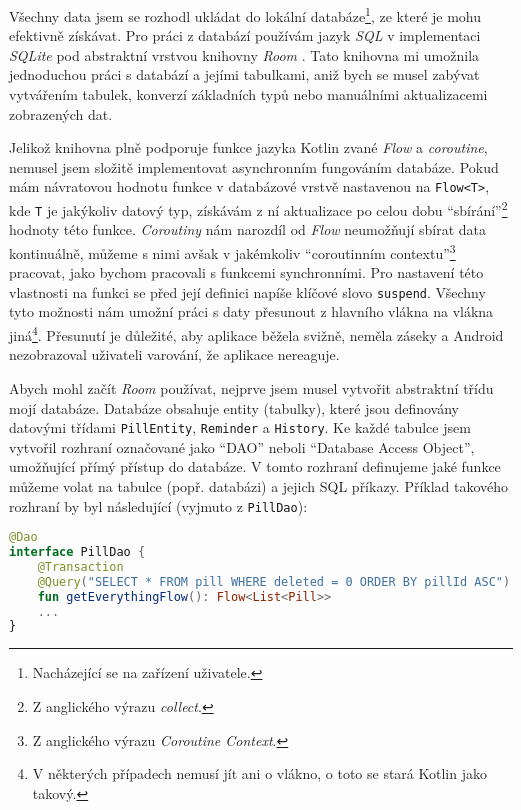 \documentclass[../TakeYourPill.tex]{subfiles}
\begin{document}
Všechny data jsem se rozhodl ukládat do lokální databáze\footnote{Nacházející se na zařízení uživatele.}, ze které je mohu efektivně získávat. Pro práci z databází používám jazyk \textit{SQL} v implementaci \textit{SQLite} pod abstraktní vrstvou knihovny \textit{Room} \cite{room}. Tato knihovna mi umožnila jednoduchou práci s databází a jejími tabulkami, aniž bych se musel zabývat vytvářením tabulek, konverzí základních typů nebo manuálními aktualizacemi zobrazených dat. 

Jelikož knihovna plně podporuje funkce jazyka Kotlin zvané \textit{Flow} a \textit{coroutine}, nemusel jsem složitě implementovat asynchronním fungováním databáze. Pokud mám návratovou hodnotu funkce v databázové vrstvě nastavenou na \texttt{Flow<T>}, kde \texttt{T} je jakýkoliv datový typ, získávám z ní aktualizace po celou dobu \enquote{sbírání}\footnote{Z anglického výrazu \textit{collect}.} hodnoty této funkce. \textit{Coroutiny} nám narozdíl od \textit{Flow} neumožňují sbírat data kontinuálně, můžeme s nimi avšak v jakémkoliv \enquote{coroutinním contextu}\footnote{Z anglického výrazu \textit{Coroutine Context}.} pracovat, jako bychom pracovali s funkcemi synchronními. Pro nastavení této vlastnosti na funkci se před její definici napíše klíčové slovo \texttt{suspend}. Všechny tyto možnosti nám umožní práci s daty přesunout z hlavního vlákna na vlákna jiná\footnote{V některých případech nemusí jít ani o vlákno, o toto se stará Kotlin jako takový.}. Přesunutí je důležité, aby aplikace běžela svižně, neměla záseky a Android nezobrazoval uživateli varování, že aplikace nereaguje.

Abych mohl začít \textit{Room} používat, nejprve jsem musel vytvořit abstraktní třídu mojí databáze. Databáze obsahuje entity (tabulky), které jsou definovány datovými třídami \texttt{PillEntity}, \texttt{Reminder} a \texttt{History}. Ke každé tabulce jsem vytvořil rozhraní označované jako \enquote{DAO} neboli \enquote{Database Access Object}, umožňující přímý přístup do databáze. V tomto rozhraní definujeme jaké funkce můžeme volat na tabulce (popř. databázi) a jejich SQL příkazy. Příklad takového rozhraní by byl následující (vyjmuto z \texttt{PillDao}):

\setmonofont{JetBrains Mono}
\begin{lstlisting}[language=Kotlin]
@Dao
interface PillDao {
    @Transaction
    @Query("SELECT * FROM pill WHERE deleted = 0 ORDER BY pillId ASC")
    fun getEverythingFlow(): Flow<List<Pill>>
    ...
}
\end{lstlisting}
\setmonofont{Latin Modern Mono}
\end{document}
